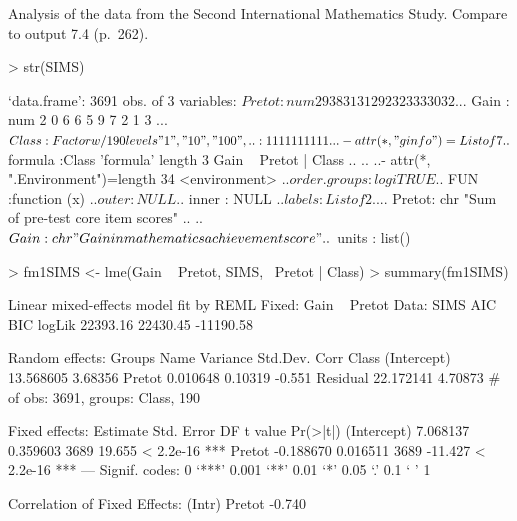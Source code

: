 \documentclass[12pt]{article}
\begin{document}
Analysis of the data from the Second International Mathematics Study.  
Compare to output 7.4 (p.~262).
\begin{Schunk}
\begin{Sinput}
> str(SIMS)
\end{Sinput}
\begin{Soutput}
`data.frame':	3691 obs. of  3 variables:
 $ Pretot: num  29 38 31 31 29 23 23 33 30 32 ...
 $ Gain  : num  2 0 6 6 5 9 7 2 1 3 ...
 $ Class : Factor w/ 190 levels "1","10","100",..: 1 1 1 1 1 1 1 1 1 1 ...
 - attr(*, "ginfo")=List of 7
  ..$ formula     :Class 'formula' length 3 Gain ~ Pretot | Class
  .. .. ..- attr(*, ".Environment")=length 34 <environment> 
  ..$ order.groups: logi TRUE
  ..$ FUN         :function (x)  
  ..$ outer       : NULL
  ..$ inner       : NULL
  ..$ labels      :List of 2
  .. ..$ Pretot: chr "Sum of pre-test core item scores"
  .. ..$ Gain  : chr "Gain in mathematics achievement score"
  ..$ units       : list()
\end{Soutput}
\begin{Sinput}
> fm1SIMS <- lme(Gain ~ Pretot, SIMS, ~Pretot | Class)
> summary(fm1SIMS)
\end{Sinput}
\begin{Soutput}
Linear mixed-effects model fit by REML
Fixed: Gain ~ Pretot 
 Data: SIMS 
      AIC      BIC    logLik
 22393.16 22430.45 -11190.58

Random effects:
 Groups   Name        Variance  Std.Dev. Corr   
 Class    (Intercept) 13.568605 3.68356         
          Pretot       0.010648 0.10319  -0.551 
 Residual             22.172141 4.70873         
# of obs: 3691, groups: Class, 190

Fixed effects:
               Estimate  Std. Error   DF t value  Pr(>|t|)    
(Intercept)    7.068137    0.359603 3689  19.655 < 2.2e-16 ***
Pretot        -0.188670    0.016511 3689 -11.427 < 2.2e-16 ***
---
Signif. codes:  0 `***' 0.001 `**' 0.01 `*' 0.05 `.' 0.1 ` ' 1 

Correlation of Fixed Effects:
       (Intr)
Pretot -0.740
\end{Soutput}
\end{Schunk}
\end{document}
